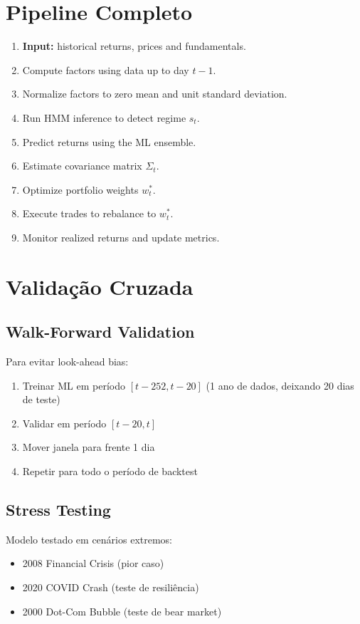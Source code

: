 \documentclass[12pt,a4paper]{article}
\begin{document}
\section{Pipeline Completo}

\begin{enumerate}
    \item \textbf{Input:} historical returns, prices and fundamentals.
    \item Compute factors using data up to day $t-1$.
    \item Normalize factors to zero mean and unit standard deviation.
    \item Run HMM inference to detect regime $s_t$.
    \item Predict returns using the ML ensemble.
    \item Estimate covariance matrix $\Sigma_t$.
    \item Optimize portfolio weights $w_t^*$.
    \item Execute trades to rebalance to $w_t^*$.
    \item Monitor realized returns and update metrics.
\end{enumerate}

\section{Validação Cruzada}

\subsection{Walk-Forward Validation}

Para evitar look-ahead bias:

\begin{enumerate}
    \item Treinar ML em período $[t-252, t-20]$ (1 ano de dados, deixando 20 dias de teste)
    \item Validar em período $[t-20, t]$
    \item Mover janela para frente 1 dia
    \item Repetir para todo o período de backtest
\end{enumerate}

\subsection{Stress Testing}

Modelo testado em cenários extremos:
\begin{itemize}
    \item 2008 Financial Crisis (pior caso)
    \item 2020 COVID Crash (teste de resiliência)
    \item 2000 Dot-Com Bubble (teste de bear market)
\end{itemize}
\end{document}
